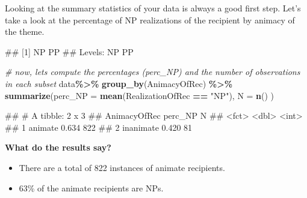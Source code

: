 \documentclass[
]{book}
\newenvironment{Shaded}{\begin{snugshade}}{\end{snugshade}}
\newcommand{\AttributeTok}[1]{\textcolor[rgb]{0.13,0.29,0.53}{#1}}
\newcommand{\CommentTok}[1]{\textcolor[rgb]{0.56,0.35,0.01}{\textit{#1}}}
\newcommand{\FunctionTok}[1]{\textcolor[rgb]{0.13,0.29,0.53}{\textbf{#1}}}
\newcommand{\NormalTok}[1]{#1}
\newcommand{\SpecialCharTok}[1]{\textcolor[rgb]{0.81,0.36,0.00}{\textbf{#1}}}
\newcommand{\StringTok}[1]{\textcolor[rgb]{0.31,0.60,0.02}{#1}}
\providecommand{\tightlist}{%
  \setlength{\itemsep}{0pt}\setlength{\parskip}{0pt}}
\begin{document}
Looking at the summary statistics of your data is always a good first step. Let's take a look at the percentage of NP realizations of the recipient by animacy of the theme.

\begin{Shaded}
\end{Shaded}

\begin{Shaded}
\begin{Highlighting}[]
\NormalTok{\#\# [1] NP PP}
\NormalTok{\#\# Levels: NP PP}
\end{Highlighting}
\end{Shaded}

\begin{Shaded}
\begin{Highlighting}[]
\CommentTok{\# now, let\textquotesingle{}s compute the percentages (perc\_NP) and the number of observations in each subset}
\NormalTok{data}\SpecialCharTok{\%\textgreater{}\%} 
  \FunctionTok{group\_by}\NormalTok{(AnimacyOfRec) }\SpecialCharTok{\%\textgreater{}\%} 
  \FunctionTok{summarize}\NormalTok{(}\AttributeTok{perc\_NP =} \FunctionTok{mean}\NormalTok{(RealizationOfRec }\SpecialCharTok{==} \StringTok{"NP"}\NormalTok{), }
                   \AttributeTok{N =} \FunctionTok{n}\NormalTok{()}
\NormalTok{                  )}
\end{Highlighting}
\end{Shaded}

\begin{Shaded}
\begin{Highlighting}[]
\NormalTok{\#\# \# A tibble: 2 x 3}
\NormalTok{\#\#   AnimacyOfRec perc\_NP     N}
\NormalTok{\#\#   \textless{}fct\textgreater{}          \textless{}dbl\textgreater{} \textless{}int\textgreater{}}
\NormalTok{\#\# 1 animate        0.634   822}
\NormalTok{\#\# 2 inanimate      0.420    81}
\end{Highlighting}
\end{Shaded}

\textbf{What do the results say?}

\begin{itemize}
\tightlist
\item
  There are a total of 822 instances of animate recipients.
\item
  63\% of the animate recipients are NPs.
\end{itemize}
\end{document}

